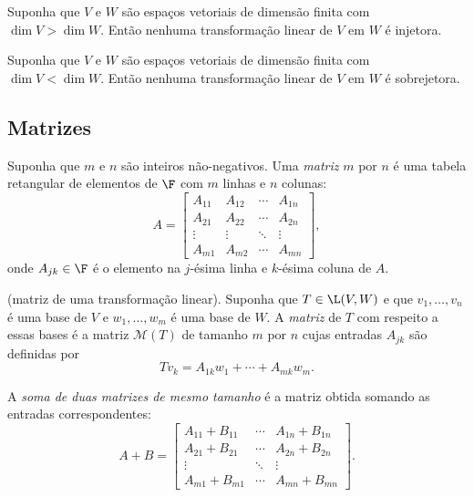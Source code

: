 \documentclass{article}
\begin{document}
\begin{cor}
    Suponha que \(V\) e \(W\) são espaços vetoriais de dimensão finita com \(\dim V > \dim W\). Então nenhuma transformação linear de \(V\) em \(W\) é injetora.
\end{cor}

\begin{cor}
    Suponha que \(V\) e \(W\) são espaços vetoriais de dimensão finita com \(\dim V < \dim W\). Então nenhuma transformação linear de \(V\) em \(W\) é sobrejetora.
\end{cor}

\subsection{Matrizes}
\begin{defn}
    Suponha que \(m\) e \(n\) são inteiros não-negativos. Uma \emph{matriz} \(m\) por \(n\) é uma tabela retangular de elementos de \(\F\) com \(m\) linhas e \(n\) colunas:
    \[
        A = \begin{bmatrix}
            A_{11} & A_{12} & \cdots & A_{1n} \\
            A_{21} & A_{22} & \cdots & A_{2n} \\
            \vdots & \vdots & \ddots & \vdots \\
            A_{m1} & A_{m2} & \cdots & A_{mn}
        \end{bmatrix},
    \]
    \noindent onde \(A_{jk} \in \F\) é o elemento na \(j\)-ésima linha e \(k\)-ésima coluna de \(A\).
\end{defn}

\begin{defn} (matriz de uma transformação linear).
    Suponha que \(T \in \L(V, W)\) e que \(v_1, \ldots, v_n\) é uma base de \(V\) e \(w_1, \ldots, w_m\) é uma base de \(W\). A \emph{matriz} de \(T\) com respeito a essas bases é a matriz \(\mathcal{M}(T)\) de tamanho \(m\) por \(n\) cujas entradas \(A_{jk}\) são definidas por
    \[
        Tv_k = A_{1k} w_1 + \cdots + A_{mk} w_m.
    \]    
\end{defn}

\begin{defn}
    A \emph{soma de duas matrizes de mesmo tamanho} é a matriz obtida somando as entradas correspondentes:
    \[
        A + B = \begin{bmatrix}
            A_{11} + B_{11} & \cdots & A_{1n} + B_{1n} \\
            A_{21} + B_{21} & \cdots & A_{2n} + B_{2n} \\
            \vdots & \ddots & \vdots \\
            A_{m1} + B_{m1} & \cdots & A_{mn} + B_{mn}
        \end{bmatrix}.
    \]
\end{defn}
\end{document}
